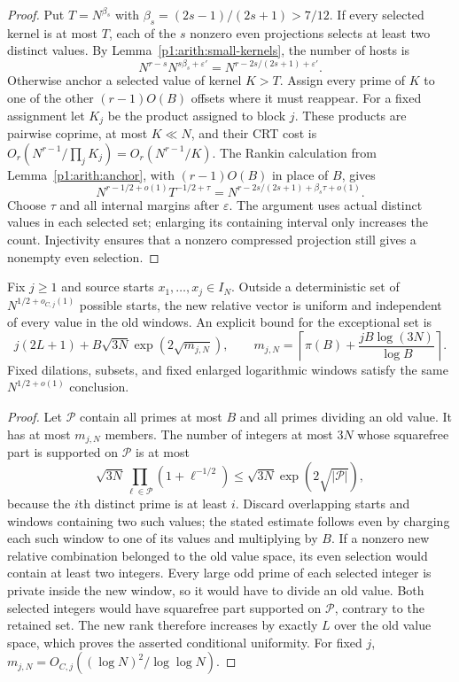\begin{proof}
Put $T=N^{\beta_s}$ with $\beta_s=(2s-1)/(2s+1)>7/12$.
If every selected kernel is at most $T$, each of the $s$ nonzero even
projections selects at least two distinct values.  By
Lemma~\ref{p1:arith:small-kernels}, the number of hosts is
\[
 N^{r-s}N^{s\beta_s+\varepsilon'}
   =N^{r-2s/(2s+1)+\varepsilon'}.
\]
Otherwise anchor a selected value of kernel $K>T$.
Assign every prime of $K$ to one of the other $(r-1)O(B)$ offsets where
it must reappear.  For a fixed assignment let $K_j$ be the product
assigned to block $j$.  These products are pairwise coprime, at most
$K\ll N$, and their CRT cost is
$O_r(N^{r-1}/\prod_jK_j)=O_r(N^{r-1}/K)$.
The Rankin calculation from Lemma~\ref{p1:arith:anchor}, with
$(r-1)O(B)$ in place of $B$, gives
\[
 N^{r-1/2+o(1)}T^{-1/2+\tau}
 =N^{r-2s/(2s+1)+\beta_s\tau+o(1)}.
\]
Choose $\tau$ and all internal margins after $\varepsilon$.
The argument uses actual distinct values in each selected set; enlarging
its containing interval only increases the count.  Injectivity ensures
that a nonzero compressed projection still gives a nonempty even selection.
\end{proof}

\begin{proposition}
\label{p1:arith:fixed-branching}
Fix $j\geq1$ and source starts $x_1,\ldots,x_j\in I_N$.
Outside a deterministic set of $N^{1/2+o_{C,j}(1)}$ possible starts,
the new relative vector is uniform and independent of every value in
the old windows.  An explicit bound for the exceptional set is
\[
 j(2L+1)+B\sqrt{3N}\exp(2\sqrt{m_{j,N}}),\qquad
 m_{j,N}=\left\lceil\pi(B)+\frac{jB\log(3N)}{\log B}\right\rceil.
\]
Fixed dilations, subsets, and fixed enlarged logarithmic windows satisfy
the same $N^{1/2+o(1)}$ conclusion.
\end{proposition}

\begin{proof}
Let $\mathcal P$ contain all primes at most $B$ and all primes dividing
an old value.  It has at most $m_{j,N}$ members.
The number of integers at most $3N$ whose squarefree part is supported
on $\mathcal P$ is at most
\[
 \sqrt{3N}\prod_{\ell\in\mathcal P}(1+\ell^{-1/2})
 \leq\sqrt{3N}\exp(2\sqrt{|\mathcal P|}),
\]
because the $i$th distinct prime is at least $i$.
Discard overlapping starts and windows containing two such values;
the stated estimate follows even by charging each such window to one
of its values and multiplying by $B$.
If a nonzero new relative combination belonged to the old value space,
its even selection would contain at least two integers.  Every large
odd prime of each selected integer is private inside the new window,
so it would have to divide an old value.  Both selected integers would
have squarefree part supported on $\mathcal P$, contrary to the retained
set.  The new rank therefore increases by exactly $L$ over the old
value space, which proves the asserted conditional uniformity.
For fixed $j$, $m_{j,N}=O_{C,j}((\log N)^2/\log\log N)$.
\end{proof}

